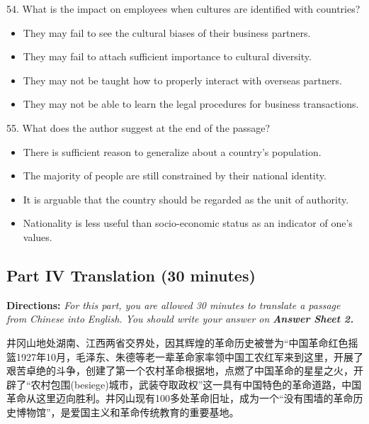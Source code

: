 \documentclass[UTF8,11pt]{ctexart}
\begin{document}
54. What is the impact on employees when cultures are identified with countries?


\begin{itemize}[leftmargin=2em,itemsep=.2em,topsep=.4em]\item[A.] They may fail to see the cultural biases of their business partners.
\item[B.] They may fail to attach sufficient importance to cultural diversity.
\item[C.] They may not be taught how to properly interact with overseas partners.
\item[D.] They may not be able to learn the legal procedures for business transactions.
\end{itemize}

55. What does the author suggest at the end of the passage?


\begin{itemize}[leftmargin=2em,itemsep=.2em,topsep=.4em]\item[A.] There is sufficient reason to generalize about a country's population.
\item[B.] The majority of people are still constrained by their national identity.
\item[C.] It is arguable that the country should be regarded as the unit of authority.
\item[D.] Nationality is less useful than socio-economic status as an indicator of one's values.
\end{itemize}

\subsection*{\textbf{Part IV} \textbf{Translation} \textbf{(30 minutes)}}


\textbf{Directions: }\textit{For this part, you are allowed 30 minutes to translate a passage from Chinese into} \textit{English. You should write your answer on }\textbf{\textit{Answer Sheet 2.}}


井冈山地处湖南、江西两省交界处，因其辉煌的革命历史被誉为“中国革命红色摇篮1927年10月，毛泽东、朱德等老一辈革命家率领中国工农红军来到这里，开展了艰苦卓绝的斗争，创建了第一个农村革命根据地，点燃了中国革命的星星之火，开辟了“农村包围(besiege)城市，武装夺取政权”这一具有中国特色的革命道路，中国革命从这里迈向胜利。井冈山现有100多处革命旧址，成为一个“没有围墙的革命历史博物馆”，是爱国主义和革命传统教育的重要基地。
\end{document}
